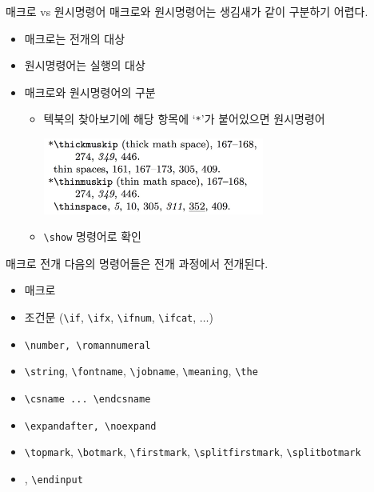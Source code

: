 \documentclass{beamer}
\begin{document}
%
\begin{frame}[fragile]{매크로 vs 원시명령어}
  매크로와 원시명령어는 생김새가 같이 구분하기 어렵다.
  \begin{itemize}
  \item 매크로는 \alert{전개}의 대상
  \item 원시명령어는 \alert{실행}의 대상
  \item 매크로와 원시명령어의 구분
    \begin{itemize}
    \item 텍북의 찾아보기에 해당 항목에 `\verb+*+'가 붙어있으면 원시명령어
      
      \smallskip
      \includegraphics[height=2.5cm]{index.jpg}
    \item \verb+\show+ 명령어로 확인
    \end{itemize}
  \end{itemize}
\end{frame}


%
\begin{frame}[fragile]{매크로 전개}
  다음의 명령어들은 전개 과정에서 전개된다.
  \begin{itemize}
  \item \alert{매크로}
  \item 조건문 (\verb+\if+, \verb+\ifx+, \verb+\ifnum+, \verb+\ifcat+, $\ldots$)
  \item \verb+\number, \romannumeral+
  \item \verb+\string+, \verb+\fontname+, \verb+\jobname+,
    \verb+\meaning+, \verb+\the+
  \item \verb+\csname ... \endcsname+
  \item \verb+\expandafter, \noexpand+
  \item \verb+\topmark+, \verb+\botmark+, \verb+\firstmark+,
    \verb+\splitfirstmark+, \verb+\splitbotmark+
  \item \verb++,  \verb+\endinput+
  \end{itemize}
\end{frame}
\end{document}
